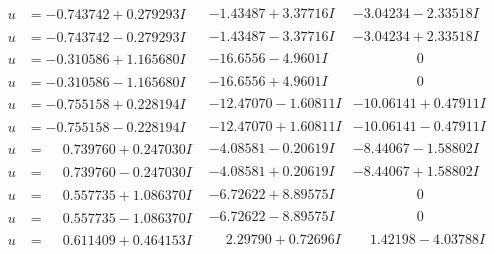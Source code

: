 \documentclass[1p]{elsarticle_modified}
\theoremstyle{definition}
\begin{document}
$$\begin{array}{c|c|c}
\begin{aligned}
u &= -0.743742 + 0.279293 I\end{aligned}
 & -1.43487 + 3.37716 I & -3.04234 - 2.33518 I \\ \hline\begin{aligned}
u &= -0.743742 - 0.279293 I\end{aligned}
 & -1.43487 - 3.37716 I & -3.04234 + 2.33518 I \\ \hline\begin{aligned}
u &= -0.310586 + 1.165680 I\end{aligned}
 & -16.6556 - 4.9601 I & \phantom{-0.000000 } 0 \\ \hline\begin{aligned}
u &= -0.310586 - 1.165680 I\end{aligned}
 & -16.6556 + 4.9601 I & \phantom{-0.000000 } 0 \\ \hline\begin{aligned}
u &= -0.755158 + 0.228194 I\end{aligned}
 & -12.47070 - 1.60811 I & -10.06141 + 0.47911 I \\ \hline\begin{aligned}
u &= -0.755158 - 0.228194 I\end{aligned}
 & -12.47070 + 1.60811 I & -10.06141 - 0.47911 I \\ \hline\begin{aligned}
u &= \phantom{-}0.739760 + 0.247030 I\end{aligned}
 & -4.08581 - 0.20619 I & -8.44067 - 1.58802 I \\ \hline\begin{aligned}
u &= \phantom{-}0.739760 - 0.247030 I\end{aligned}
 & -4.08581 + 0.20619 I & -8.44067 + 1.58802 I \\ \hline\begin{aligned}
u &= \phantom{-}0.557735 + 1.086370 I\end{aligned}
 & -6.72622 + 8.89575 I & \phantom{-0.000000 } 0 \\ \hline\begin{aligned}
u &= \phantom{-}0.557735 - 1.086370 I\end{aligned}
 & -6.72622 - 8.89575 I & \phantom{-0.000000 } 0 \\ \hline\begin{aligned}
u &= \phantom{-}0.611409 + 0.464153 I\end{aligned}
 & \phantom{-}2.29790 + 0.72696 I & \phantom{-}1.42198 - 4.03788 I \\ \hline\begin{aligned}

\end{aligned}
\end{array}$$
\end{document}

